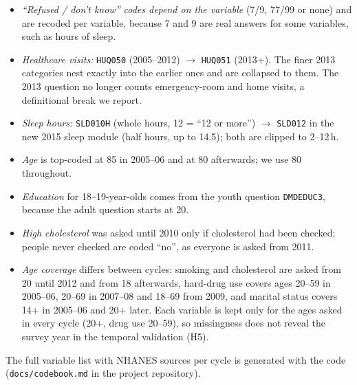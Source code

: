 \documentclass[11pt,a4paper]{article}
\newcommand{\var}[1]{\texttt{#1}}
\begin{document}
\begin{itemize}
  \item \textit{``Refused / don't know'' codes depend on the variable} (7/9, 77/99 or
        none) and are recoded per variable, because 7 and 9 are real answers for some
        variables, such as hours of sleep.
  \item \textit{Healthcare visits:} \var{HUQ050} (2005--2012) $\rightarrow$
        \var{HUQ051} (2013+). The finer 2013 categories nest exactly into the earlier
        ones and are collapsed to them. The 2013 question no longer counts
        emergency-room and home visits, a definitional break we report.
  \item \textit{Sleep hours:} \var{SLD010H} (whole hours, 12 = ``12 or more'')
        $\rightarrow$ \var{SLD012} in the new 2015 sleep module (half hours, up to
        14.5); both are clipped to 2--12\,h.
  \item \textit{Age} is top-coded at 85 in 2005--06 and at 80 afterwards; we use 80
        throughout.
  \item \textit{Education} for 18--19-year-olds comes from the youth question
        \var{DMDEDUC3}, because the adult question starts at 20.
  \item \textit{High cholesterol} was asked until 2010 only if cholesterol had been
        checked; people never checked are coded ``no'', as everyone is asked from 2011.
  \item \textit{Age coverage} differs between cycles: smoking and cholesterol are asked
        from 20 until 2012 and from 18 afterwards, hard-drug use covers ages 20--59 in
        2005--06, 20--69 in 2007--08 and 18--69 from 2009, and marital status covers
        14+ in 2005--06 and 20+ later. Each variable is kept only for the ages asked
        in every cycle (20+, drug use 20--59), so missingness does not reveal the
        survey year in the temporal validation (H5).
\end{itemize}

The full variable list with NHANES sources per cycle is generated with the code
(\var{docs/codebook.md} in the project repository).
\end{document}

